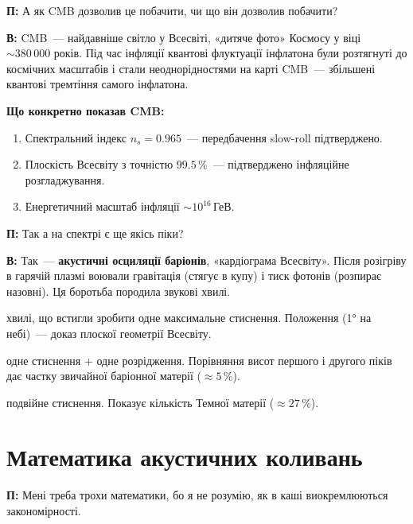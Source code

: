 \documentclass[12pt, a4paper]{article}
\newcommand{\Q}[1]{%
    \begin{questionbox}
        {\color{qcolor}\bfseries\sffamily П:} #1
    \end{questionbox}
}
\newcommand{\A}[1]{%
    \begin{answerbox}
        {\bfseries\sffamily В:} #1
    \end{answerbox}
}
\begin{document}
\Q{А як CMB дозволив це побачити, чи що він дозволив побачити?}

\A{CMB~--- найдавніше світло у Всесвіті, «дитяче фото» Космосу у віці $\sim380\,000$ років. Під час інфляції квантові флуктуації інфлатона були розтягнуті до космічних масштабів і стали неоднорідностями на карті CMB~--- збільшені квантові тремтіння самого інфлатона.

\textbf{Що конкретно показав CMB:}
\begin{enumerate}[noitemsep]
    \item Спектральний індекс $n_s = 0.965$~--- передбачення slow-roll підтверджено.
    \item Плоскість Всесвіту з точністю $99.5\,\%$~--- підтверджено інфляційне розгладжування.
    \item Енергетичний масштаб інфляції $\sim10^{16}$\,ГеВ.
\end{enumerate}}


\Q{Так а на спектрі є ще якісь піки?}

\A{Так~--- \textbf{акустичні осциляції баріонів}, «кардіограма Всесвіту». Після розігріву в гарячій плазмі воювали гравітація (стягує в купу) і тиск фотонів (розпирає назовні). Ця боротьба породила звукові хвилі.

\begin{description}[noitemsep]
    \item[Перший пік] хвилі, що встигли зробити одне максимальне стиснення. Положення (1° на небі)~--- доказ плоскої геометрії Всесвіту.
    \item[Другий пік] одне стиснення + одне розрідження. Порівняння висот першого і другого піків дає частку звичайної баріонної матерії ($\approx5\,\%$).
    \item[Третій пік] подвійне стиснення. Показує кількість Темної матерії ($\approx27\,\%$).
\end{description}}

\section{Математика акустичних коливань}

\Q{Мені треба трохи математики, бо я не розумію, як в каші виокремлюються закономірності.}
\end{document}
